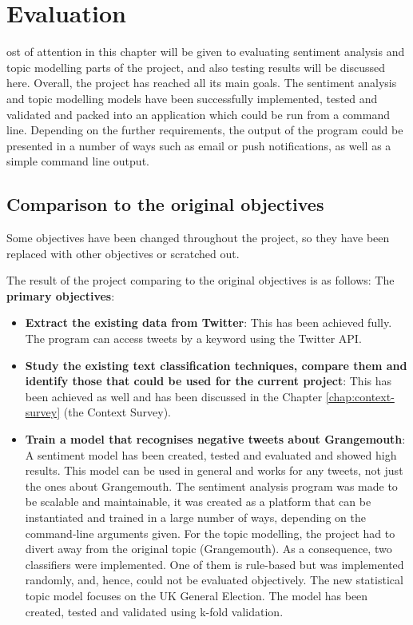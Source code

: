 \let\textcircled=\pgftextcircled
\chapter{Evaluation}
\label{chap:evaluation}


ost of attention in this chapter will be given to evaluating sentiment analysis and topic modelling parts of the project, and also testing results will be discussed here.
Overall, the project has reached all its main goals. The sentiment analysis and topic modelling models have been successfully implemented, tested and validated and packed into an application which could be run from a command line. Depending on the further requirements, the output of the program could be presented in a number of ways such as email or push notifications, as well as a simple command line output. 

\section{Comparison to the original objectives}
Some objectives have been changed throughout the project, so they have been replaced with other objectives or scratched out. 

\label{sec:originalObjectives}
The result of the project comparing to the original objectives is as follows:
The \textbf{primary objectives}:
\begin{itemize}
    \item \textbf{Extract the existing data from Twitter}: This has been achieved fully. The program can access tweets by a keyword using the Twitter API. 
    \item \textbf{Study the existing text classification techniques, compare them and identify those that could be used for the current project}: This has been achieved as well and has been discussed in the Chapter \ref{chap:context-survey} (the Context Survey). 
    \item \textbf{Train a model that recognises negative tweets about Grangemouth}: A sentiment model has been created, tested and evaluated and showed high results. This model can be used in general and works for any tweets, not just the ones about Grangemouth. The sentiment analysis program was made to be scalable and maintainable, it was created as a platform that can be instantiated and trained in a large number of ways, depending on the command-line arguments given. For the topic modelling, the project had to divert away from the original topic (Grangemouth). As a consequence, two classifiers were implemented. One of them is rule-based but was implemented randomly, and, hence, could not be evaluated objectively. The new statistical topic model focuses on the UK General Election. The model has been created, tested and validated using k-fold validation. 
\end{itemize}

